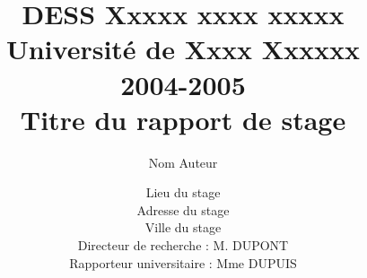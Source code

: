 \documentclass[12pt,a4paper,utf8x]{report}
\title
{
	\normalsize{DESS Xxxxx xxxx xxxxx\\
	Université de Xxxx Xxxxxx\\
	2004-2005}\\
	\vspace{15mm}
	\Huge{Titre du rapport de stage}
}
\author{Nom Auteur\\
	\vspace{45mm}
}
\date{	
	\normalsize{Lieu du stage\\
	Adresse du stage\\
	Ville du stage\\ 
	\vspace{5mm}	
	Directeur de recherche : M. DUPONT \\
	Rapporteur universitaire : Mme DUPUIS
	}
}
\begin{document}
\maketitle



\tableofcontents
\listoffigures
\listoftables
\clearpage

\begin{onehalfspace}



%







\end{onehalfspace}

\nocite{MotClef1}
\nocite{MotClef2}
\nocite{MotClef3}
\nocite{MotClef4}
\nocite{MotClef5}


\printindex
\appendix




%
\end{document}
